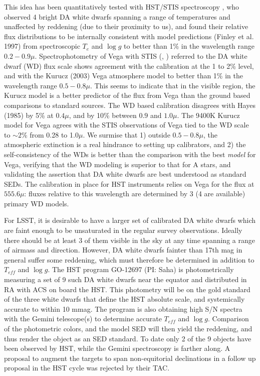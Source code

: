 \documentclass[12pt,preprint]{aastex}
\begin{document}
This idea has been quantitatively tested 
with HST/STIS spectroscopy \citep{Bohlin2000}, who observed 4 bright DA white dwarfs spanning a range of temperatures and unaffected by reddening (due to their proximity to us), and found their relative flux distributions to be internally consistent with model predictions (Finley et al. 1997) from spectroscopic $T_{e}$ and $\log g$ to better than 1\% in the wavelength range $0.2 - 0.9\mu$. Spectrophotometry of Vega with STIS (\cite{Bohlin2004a}, \cite{Bohlin2007}) referred to the DA white dwarf (WD) flux scale shows agreement with the \cite{Hayes1985} calibration at the 1 to 2\% level, and with the Kurucz (2003) Vega atmosphere model to better than 1\%   in the wavelength range $0.5 - 0.8\mu$.  This seems to indicate  that in the visible region, the Kurucz model is a better predictor of the flux from Vega than the ground based comparisons to standard sources. The WD based calibration disagrees with Hayes (1985) by 5\% at $0.4\mu$, and by 10\% between 
$0.9$ and $1.0\mu$. The 9400K Kurucz model for Vega agrees with the STIS observations of Vega tied 
to the WD scale to $\sim 2$\%  from 0.28 to 1.0$\mu$. We surmise that  1) outside $0.5 - 0.8\mu$, the atmospheric extinction is a real hindrance to setting up calibrators, and 2) the self-consistency of the WDs 
is better than the comparison with the best {\it model} for Vega, verifying that the WD modeling is superior to that for  A  stars, and validating the assertion that  DA white dwarfs are best understood as standard SEDs. 
The calibration in place for HST instruments relies on Vega for the flux at $555.6\mu$: fluxes relative to 
this wavelength are determined by 3 (4 are available) primary WD models.

For LSST, it is desirable to have a larger set of calibrated DA white dwarfs which are faint enough to be unsaturated in the regular survey observations. Ideally there should be at least 3 of them visible in the sky at any time spanning a range of airmass and direction.  However, DA white dwarfs fainter than 17th mag 
in general suffer some reddening, which must therefore be determined in addition to $T_{eff}$ and $\log g$.
The HST program GO-12697 (PI: Saha) is photometrically measuring a set of 9 such DA white dwarfs near the equator and distributed in RA with ACS on board the HST. This photometry will be on the gold standard 
of the three white dwarfs that define the HST absolute scale, and systemically accurate to within 10 mmag.
The program is also obtaining high S/N spectra with the Gemini telescope(s) to determine accurate 
$T_{eff}$ and $\log g$.  Comparison of the photometric colors, and the model SED will then yield the 
reddening, and thus render the object as an SED standard.  To date only 2 of the 9 objects have been observed by HST,  while the Gemini spectroscopy is farther along.   A proposal to augment the targets to span 
non-equitorial declinations 
in a follow up proposal in the HST cycle was rejected by their TAC.  
\end{document}
